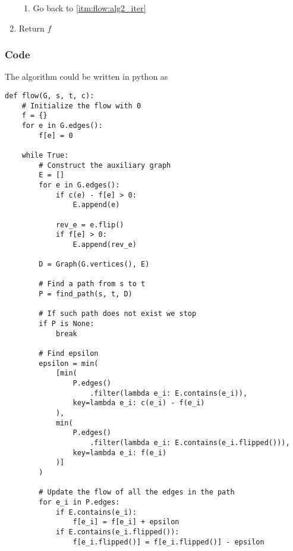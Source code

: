 \documentclass[14pt]{extarticle}
\begin{document}
\begin{enumerate}
\begin{enumerate}[label*=\arabic*.]
              \item Go back to \autoref{itm:flow:alg2_iter}
          \end{enumerate}
    \item \label{itm:flow:alg2_return} Return $f$
\end{enumerate}

\subsubsection{Code}

The algorithm could be written in python as
\begin{verbatim}
def flow(G, s, t, c):
    # Initialize the flow with 0
    f = {}
    for e in G.edges():
        f[e] = 0

    while True:
        # Construct the auxiliary graph
        E = []
        for e in G.edges():
            if c(e) - f[e] > 0:
                E.append(e)
            
            rev_e = e.flip()
            if f[e] > 0:
                E.append(rev_e)

        D = Graph(G.vertices(), E)

        # Find a path from s to t
        P = find_path(s, t, D)

        # If such path does not exist we stop
        if P is None:
            break

        # Find epsilon
        epsilon = min(
            [min(
                P.edges()
                    .filter(lambda e_i: E.contains(e_i)),
                key=lambda e_i: c(e_i) - f(e_i)
            ),
            min(
                P.edges()
                    .filter(lambda e_i: E.contains(e_i.flipped())),
                key=lambda e_i: f(e_i)
            )]
        )

        # Update the flow of all the edges in the path
        for e_i in P.edges:
            if E.contains(e_i):
                f[e_i] = f[e_i] + epsilon
            if E.contains(e_i.flipped()):
                f[e_i.flipped()] = f[e_i.flipped()] - epsilon
\end{verbatim}
\end{document}
